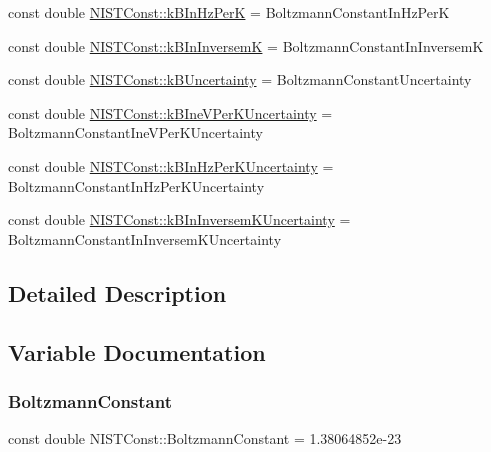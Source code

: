 \begin{DoxyCompactItemize}
\item 
const double \hyperlink{group___boltzmann_constant_gaa7a3aa5798c9617d09120f8041c93433}{N\+I\+S\+T\+Const\+::k\+B\+In\+Hz\+PerK} = Boltzmann\+Constant\+In\+Hz\+PerK
\item 
const double \hyperlink{group___boltzmann_constant_ga54bf445c848dc6dc425076bf6ab45d83}{N\+I\+S\+T\+Const\+::k\+B\+In\+InversemK} = Boltzmann\+Constant\+In\+InversemK
\item 
const double \hyperlink{group___boltzmann_constant_ga60fef44440e26486ae70903ff601a8e5}{N\+I\+S\+T\+Const\+::k\+B\+Uncertainty} = Boltzmann\+Constant\+Uncertainty
\item 
const double \hyperlink{group___boltzmann_constant_gaf7b77bfffef71941035ce9d3164c94ab}{N\+I\+S\+T\+Const\+::k\+B\+Ine\+V\+Per\+K\+Uncertainty} = Boltzmann\+Constant\+Ine\+V\+Per\+K\+Uncertainty
\item 
const double \hyperlink{group___boltzmann_constant_gacee490b0a8b778a3a5f381be776f493e}{N\+I\+S\+T\+Const\+::k\+B\+In\+Hz\+Per\+K\+Uncertainty} = Boltzmann\+Constant\+In\+Hz\+Per\+K\+Uncertainty
\item 
const double \hyperlink{group___boltzmann_constant_gafb5daa855b569ec25364ad61ecea9b2a}{N\+I\+S\+T\+Const\+::k\+B\+In\+Inversem\+K\+Uncertainty} = Boltzmann\+Constant\+In\+Inversem\+K\+Uncertainty
\end{DoxyCompactItemize}


\subsection{Detailed Description}


\subsection{Variable Documentation}
\mbox{\label{group___boltzmann_constant_ga505057a2eb7e925fde668cc1025331df}} 
\subsubsection{\texorpdfstring{Boltzmann\+Constant}{BoltzmannConstant}}
{\footnotesize\ttfamily const double N\+I\+S\+T\+Const\+::\+Boltzmann\+Constant = 1.\+38064852e-\/23}


